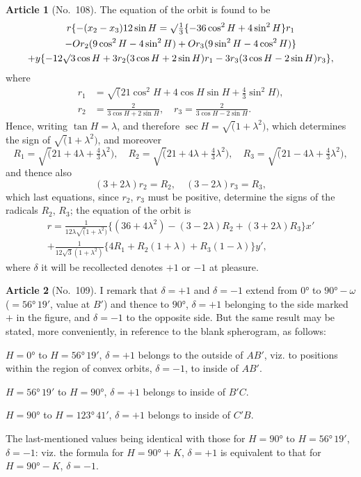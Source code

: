 \documentclass[11pt,a4paper]{article}
\theoremstyle{definition}
\newtheorem{art}{Article}
\begin{document}
\begin{art}[No.~108]
The equation of the orbit is found to be
\begin{multline*}
r\{-(x_2 - x_3)12\sin H = \surd\tfrac{1}{3}\{-36\cos^2 H + 4\sin^2 H\}r_1\\
- Or_2(9\cos^2 H - 4\sin^2 H) + Or_3(9\sin^2 H - 4\cos^2 H)\}\\
+ y\{-12\surd 3\cos H + 3r_2(3\cos H + 2\sin H)r_1 - 3r_3(3\cos H - 2\sin H)r_3\},
\end{multline*}
where
\begin{align*}
r_1 &= \surd(21\cos^2 H + 4\cos H\sin H + \tfrac{4}{3}\sin^2 H),\\
r_2 &= \frac{2}{3\cos H + 2\sin H}, \quad r_3 = \frac{2}{3\cos H - 2\sin H}.
\end{align*}
Hence, writing $\tan H = \lambda$, and therefore $\sec H = \surd(1 + \lambda^2)$, which determines the sign of $\surd(1 + \lambda^2)$, and moreover
\[
R_1 = \surd(21 + 4\lambda + \tfrac{4}{3}\lambda^2), \quad R_2 = \surd(21 + 4\lambda + \tfrac{4}{3}\lambda^2), \quad R_3 = \surd(21 - 4\lambda + \tfrac{4}{3}\lambda^2),
\]
and thence also
\[
(3 + 2\lambda)r_2 = R_2, \quad (3 - 2\lambda)r_3 = R_3,
\]
which last equations, since $r_2$, $r_3$ must be positive, determine the signs of the radicals $R_2$, $R_3$; the equation of the orbit is
\begin{multline*}
r = \frac{1}{12\lambda\surd(1 + \lambda^2)}\{(36 + 4\lambda^2) - (3 - 2\lambda)R_2 + (3 + 2\lambda)R_3\}x'\\
+ \frac{1}{12\surd 3(1 + \lambda^2)}\{4R_1 + R_2(1 + \lambda) + R_3(1 - \lambda)\}y',
\end{multline*}
where $\delta$ it will be recollected denotes $+1$ or $-1$ at pleasure.
\end{art}

\begin{art}[No.~109]
I remark that $\delta = +1$ and $\delta = -1$ extend from $0°$ to $90° - \omega$ ($= 56°\, 19'$, value at $B'$) and thence to $90°$, $\delta = +1$ belonging to the side marked $+$ in the figure, and $\delta = -1$ to the opposite side. But the same result may be stated, more conveniently, in reference to the blank spherogram, as follows:

$H = 0°$ to $H = 56°\, 19'$, $\delta = +1$ belongs to the outside of $AB'$, viz. to positions within the region of convex orbits, $\delta = -1$, to inside of $AB'$.

$H = 56°\, 19'$ to $H = 90°$, $\delta = +1$ belongs to inside of $B'C$.

$H = 90°$ to $H = 123°\, 41'$, $\delta = +1$ belongs to inside of $C'B$.

The last-mentioned values being identical with those for $H = 90°$ to $H = 56°\, 19'$, $\delta = -1$: viz. the formula for $H = 90° + K$, $\delta = +1$ is equivalent to that for $H = 90° - K$, $\delta = -1$.
\end{art}
\end{document}
